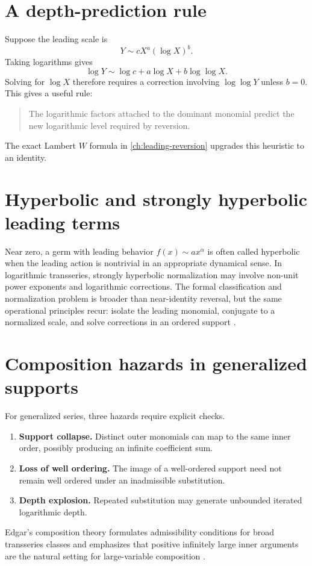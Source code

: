 \documentclass[11pt,openany]{book}
\theoremstyle{definition}
\theoremstyle{plain}
\theoremstyle{remark}
\begin{document}

\section{A depth-prediction rule}
Suppose the leading scale is
\[
 Y\sim cX^a(\log X)^b.
\]
Taking logarithms gives
\[
 \log Y\sim \log c+a\log X+b\log\log X.
\]
Solving for \(\log X\) therefore requires a correction involving \(\log\log Y\) unless \(b=0\). This gives a useful rule:
\begin{quote}
The logarithmic factors attached to the dominant monomial predict the new logarithmic level required by reversion.
\end{quote}
The exact Lambert \(W\) formula in \cref{ch:leading-reversion} upgrades this heuristic to an identity.

\section{Hyperbolic and strongly hyperbolic leading terms}
Near zero, a germ with leading behavior \(f(x)\sim ax^\alpha\) is often called hyperbolic when the leading action is nontrivial in an appropriate dynamical sense. In logarithmic transseries, strongly hyperbolic normalization may involve non-unit power exponents and logarithmic corrections. The formal classification and normalization problem is broader than near-identity reversal, but the same operational principles recur: isolate the leading monomial, conjugate to a normalized scale, and solve corrections in an ordered support \cite{peran-logtransseries}.

\section{Composition hazards in generalized supports}
For generalized series, three hazards require explicit checks.
\begin{enumerate}
\item \textbf{Support collapse.} Distinct outer monomials can map to the same inner order, possibly producing an infinite coefficient sum.
\item \textbf{Loss of well ordering.} The image of a well-ordered support need not remain well ordered under an inadmissible substitution.
\item \textbf{Depth explosion.} Repeated substitution may generate unbounded iterated logarithmic depth.
\end{enumerate}
Edgar's composition theory formulates admissibility conditions for broad transseries classes and emphasizes that positive infinitely large inner arguments are the natural setting for large-variable composition \cite{edgar-composition}.
\end{document}

